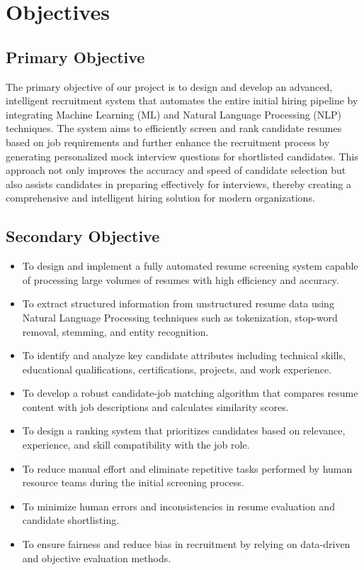 \section{Objectives}

\subsection{Primary Objective}

{%
The primary objective of our project is to design and develop an advanced, intelligent recruitment system that automates the entire initial hiring pipeline by integrating Machine Learning (ML) and Natural Language Processing (NLP) techniques. The system aims to efficiently screen and rank candidate resumes based on job requirements and further enhance the recruitment process by generating personalized mock interview questions for shortlisted candidates. This approach not only improves the accuracy and speed of candidate selection but also assists candidates in preparing effectively for interviews, thereby creating a comprehensive and intelligent hiring solution for modern organizations.}

\subsection{Secondary Objective}


\begin{itemize}
\item To design and implement a fully automated resume screening system capable of processing large volumes of resumes with high efficiency and accuracy.
\item To extract structured information from unstructured resume data using Natural Language Processing techniques such as tokenization, stop-word removal, stemming, and entity recognition.
\item To identify and analyze key candidate attributes including technical skills, educational qualifications, certifications, projects, and work experience.
\item To develop a robust candidate-job matching algorithm that compares resume content with job descriptions and calculates similarity scores.
\item To design a ranking system that prioritizes candidates based on relevance, experience, and skill compatibility with the job role.
\item To reduce manual effort and eliminate repetitive tasks performed by human resource teams during the initial screening process.
\item To minimize human errors and inconsistencies in resume evaluation and candidate shortlisting.
\item To ensure fairness and reduce bias in recruitment by relying on data-driven and objective evaluation methods.

\end{itemize}


